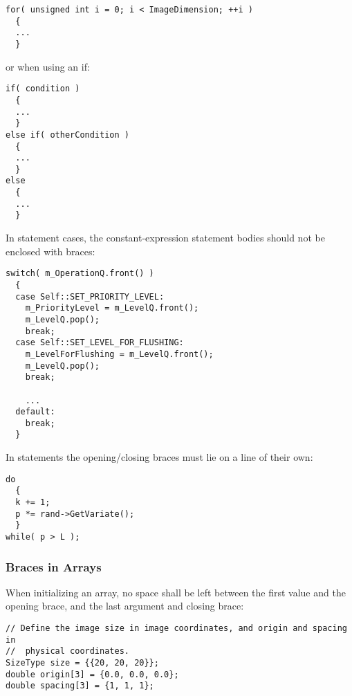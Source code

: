 \small
\begin{verbatim}
for( unsigned int i = 0; i < ImageDimension; ++i )
  {
  ...
  }
\end{verbatim}
\normalsize

or when using an if:

\small

\begin{verbatim}
if( condition )
  {
  ...
  }
else if( otherCondition )
  {
  ...
  }
else
  {
  ...
  }
\end{verbatim}
\normalsize

In  statement cases, the constant-expression statement bodies should
not be enclosed with braces:

\small
\begin{verbatim}
switch( m_OperationQ.front() )
  {
  case Self::SET_PRIORITY_LEVEL:
    m_PriorityLevel = m_LevelQ.front();
    m_LevelQ.pop();
    break;
  case Self::SET_LEVEL_FOR_FLUSHING:
    m_LevelForFlushing = m_LevelQ.front();
    m_LevelQ.pop();
    break;

    ...
  default:
    break;
  }
\end{verbatim}
\normalsize

In  statements the opening/closing braces must lie on a line of
their own:

\small
\begin{verbatim}
do
  {
  k += 1;
  p *= rand->GetVariate();
  }
while( p > L );
\end{verbatim}
\normalsize

\subsubsection{Braces in Arrays}
\label{subsubsec:BracesInArrays}

When initializing an array, no space shall be left between the first value and
the opening brace, and the last argument and closing brace:

\small
\begin{verbatim}
// Define the image size in image coordinates, and origin and spacing in
//  physical coordinates.
SizeType size = {{20, 20, 20}};
double origin[3] = {0.0, 0.0, 0.0};
double spacing[3] = {1, 1, 1};
\end{verbatim}
\normalsize


